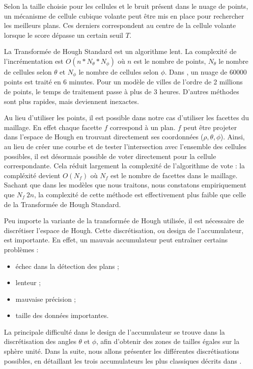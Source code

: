 \documentclass[12pt, twoside]{article}
\begin{document}
Selon la taille choisie pour les cellules et le bruit présent dans le nuage de points, un mécanisme de cellule cubique volante peut être mis en place pour rechercher les meilleurs plans. Ces derniers correspondent au centre de la cellule volante lorsque le score dépasse un certain seuil $T$.

La Transformée de Hough Standard est un algorithme lent. La complexité de l'incrémentation est $O(n*N_{\theta}*N_{\phi})$ où $n$ est le nombre de points, $N_{\theta}$ le nombre de cellules selon $\theta$ et $N_{\phi}$ le nombre de cellules selon $\phi$. Dans \cite{Hough1}, un nuage de 60000 points est traité en 6 minutes. Pour un modèle de villes de l'ordre de 2 millions de points, le temps de traitement passe à plus de 3 heures. D'autres méthodes sont plus rapides, mais deviennent inexactes.

Au lieu d'utiliser les points, il est possible dans notre cas d'utiliser les facettes du maillage. En effet chaque facette $f$ correspond à un plan. $f$ peut être projeter dans l'espace de Hough en trouvant directement ses coordonnées ($\rho, \theta, \phi$). Ainsi, au lieu de créer une courbe et de tester l'intersection avec l'ensemble des cellules possibles, il est désormais possible de voter directement pour la cellule correspondante. Cela réduit largement la complexité de l'algorithme de vote : la compléxité devient $O(N_f)$ où $N_f$ est le nombre de facettes dans le maillage. Sachant que dans les modèles que nous traitons, nous constatons empiriquement que $N_f ~ 2n$, la complexité de cette méthode est effectivement plus faible que celle de la Transformée de Hough Standard.

Peu importe la variante de la transformée de Hough utilisée, il est nécessaire de discrétiser l'espace de Hough. Cette discrétisation, ou design de l'accumulateur, est importante. En effet, un mauvais accumulateur peut entraîner certains problèmes :
\begin{itemize}
  \item échec dans la détection des plans ;
  \item lenteur ;
  \item mauvaise précision ;
  \item taille des données importantes.
\end{itemize}
La principale difficulté dans le design de l'accumulateur se trouve dans la discrétisation des angles $\theta$ et $\phi$, afin d'obtenir des zones de tailles égales sur la sphère unité. Dans la suite, nous allons présenter les différentes discrétisations possibles, en détaillant les trois accumulateurs les plus classiques décrits dans \cite{Hough2}.
\end{document}

